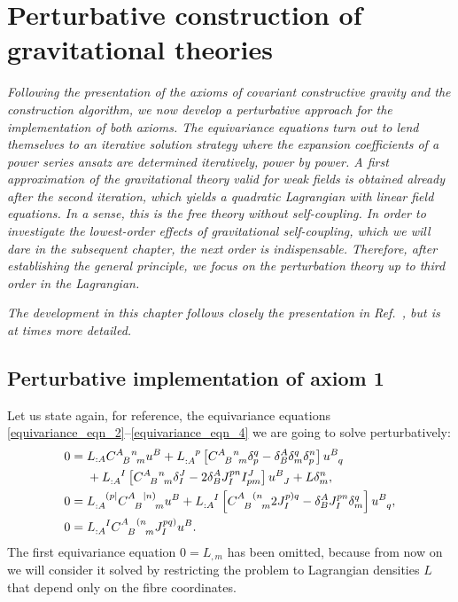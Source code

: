 \chapter{Perturbative construction of gravitational theories}
\label{chapter_perturbation}

\textit{Following the presentation of the axioms of covariant constructive gravity and the construction algorithm, we now develop a perturbative approach for the implementation of both axioms. The equivariance equations turn out to lend themselves to an iterative solution strategy where the expansion coefficients of a power series ansatz are determined iteratively, power by power. A first approximation of the gravitational theory valid for weak fields is obtained already after the second iteration, which yields a quadratic Lagrangian with linear field equations. In a sense, this is the free theory without self-coupling. In order to investigate the lowest-order effects of gravitational self-coupling, which we will dare in the subsequent chapter, the next order is indispensable. Therefore, after establishing the general principle, we focus on the perturbation theory up to third order in the Lagrangian.}

\textit{The development in this chapter follows closely the presentation in Ref.\ \cite{Alex_2020}, but is at times more detailed.}

\section{Perturbative implementation of axiom 1}

Let us state again, for reference, the equivariance equations \eqref{equivariance_eqn_2}--\eqref{equivariance_eqn_4} we are going to solve perturbatively:
\begin{equation*}
    \begin{aligned}
      0 = {} & L_{:A} \gmc{A}{B}{n}{m}u^B + L_{:A}^{\hphantom{:A}p}\left\lbrack\gmc{A}{B}{n}{m} \delta^q_p - \delta^A_B\delta^q_m\delta^n_p\right\rbrack u^{B}_{\hphantom Bq} \nonumber \\
      {} & + L_{:A}^{\hphantom{:A}I} \left\lbrack\gmc{A}{B}{n}{m} \delta^J_I - 2 \delta^A_B J^{pn}_{I} I^J_{pm}\right\rbrack u^B_{\hphantom BJ} + L\delta^n_m, \\
      0 = {} & L_{:A}^{\hphantom{:A}(p\mid} \gmc{A}{B}{\mid n)}{m} u^B + L_{:A}^{\hphantom{:A}I}\left\lbrack\gmc{A}{B}{(n}{m} 2J^{p)q}_I - \delta^A_B J^{pn}_I \delta^q_m\right\rbrack u^B_{\hphantom Bq}, \\
      0 = {} & L_{:A}^{\hphantom{:A}I} \gmc{A}{B}{(n}{m} J^{pq)}_I u^B.
    \end{aligned}
\end{equation*}
The first equivariance equation $0 = L_{,m}$ has been omitted, because from now on we will consider it solved by restricting the problem to Lagrangian densities $L$ that depend only on the fibre coordinates.

